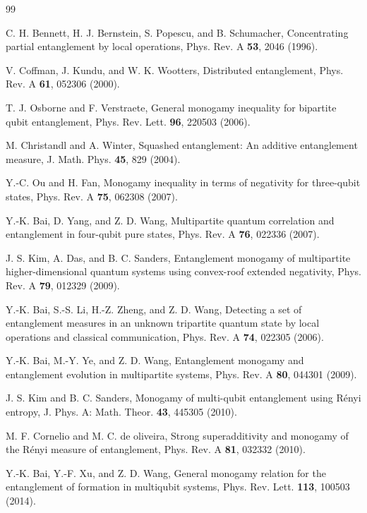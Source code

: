 \documentclass[pra,aps,twocolumn,showpacs]{revtex4}
\begin{document}
\begin{thebibliography}{99}

 C. H. Bennett, H. J. Bernstein, S. Popescu, and B. Schumacher, Concentrating partial entanglement by local operations, Phys. Rev. A \textbf{53}, 2046 (1996).

  V. Coffman, J. Kundu, and W. K. Wootters, Distributed entanglement, Phys. Rev. A \textbf{61}, 052306 (2000).

  T. J. Osborne and F. Verstraete, General monogamy inequality for bipartite qubit entanglement, Phys. Rev. Lett. \textbf{96}, 220503 (2006).

   M. Christandl and A. Winter, Squashed entanglement: An additive entanglement measure, J. Math. Phys. \textbf{45}, 829 (2004).

   Y.-C. Ou and H. Fan, Monogamy inequality in terms of negativity for three-qubit states, Phys. Rev. A \textbf{75}, 062308 (2007).


  Y.-K. Bai, D. Yang, and Z. D. Wang, Multipartite quantum correlation and entanglement in four-qubit pure states, Phys. Rev. A \textbf{76}, 022336 (2007).

   J. S. Kim, A. Das, and B. C. Sanders, Entanglement monogamy of multipartite higher-dimensional quantum systems using convex-roof extended negativity, Phys. Rev. A \textbf{79}, 012329 (2009).

   Y.-K. Bai, S.-S. Li, H.-Z. Zheng, and Z. D. Wang, Detecting a set of entanglement measures in an unknown tripartite quantum state by local operations and classical communication, Phys. Rev. A \textbf{74}, 022305 (2006).

   Y.-K. Bai, M.-Y. Ye, and Z. D. Wang, Entanglement monogamy and entanglement evolution in multipartite systems, Phys. Rev. A \textbf{80}, 044301 (2009).

   J. S. Kim and B. C. Sanders, Monogamy of multi-qubit entanglement using R\'{e}nyi entropy, J. Phys. A: Math. Theor. \textbf{43}, 445305 (2010).

  M. F. Cornelio and M. C. de oliveira, Strong superadditivity and monogamy of the R\'{e}nyi measure of entanglement, Phys. Rev. A \textbf{81}, 032332 (2010).

  Y.-K. Bai, Y.-F. Xu, and Z. D. Wang, General monogamy relation for the entanglement of formation in multiqubit systems, Phys. Rev. Lett. \textbf{113}, 100503 (2014).


\end{thebibliography}
\end{document}
